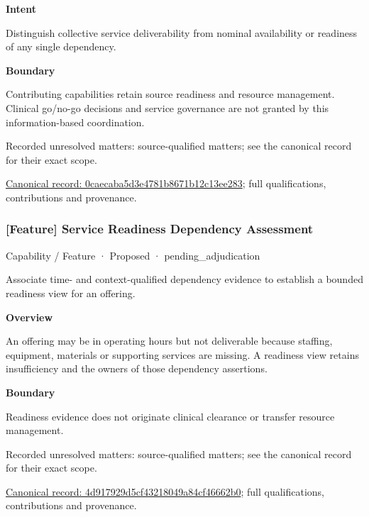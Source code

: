 \textbf{Intent}



Distinguish collective service deliverability from nominal availability or readiness of any single dependency.



\textbf{Boundary}



Contributing capabilities retain source readiness and resource management. Clinical go/no-go decisions and service governance are not granted by this information-based coordination.


{\small Recorded unresolved matters: source-qualified matters; see the canonical record for their exact scope.}\par
{\footnotesize \href{../../../../continuum/strategy/capability/0caecaba5d3e4781b8671b12c13ee283.md}{Canonical record: 0caecaba5d3e4781b8671b12c13ee283}; full qualifications, contributions and provenance.}\par
\subsubsection{[Feature] Service Readiness Dependency Assessment}

\label{element:4d917929d5cf43218049a84cf46662b0}
{\small Capability / Feature · Proposed · pending\_adjudication}\par

Associate time- and context-qualified dependency evidence to establish a bounded readiness view for an offering.



\textbf{Overview}



An offering may be in operating hours but not deliverable because staffing, equipment, materials or supporting services are missing. A readiness view retains insufficiency and the owners of those dependency assertions.



\textbf{Boundary}



Readiness evidence does not originate clinical clearance or transfer resource management.


{\small Recorded unresolved matters: source-qualified matters; see the canonical record for their exact scope.}\par
{\footnotesize \href{../../../../continuum/strategy/capability/feature/4d917929d5cf43218049a84cf46662b0.md}{Canonical record: 4d917929d5cf43218049a84cf46662b0}; full qualifications, contributions and provenance.}\par

